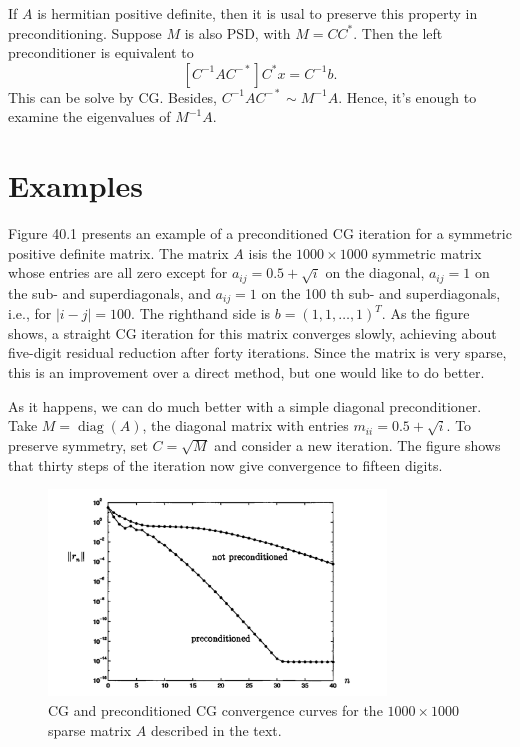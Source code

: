 If $ A $ is hermitian positive definite, then it is usal to preserve this property  in preconditioning. Suppose $ M $ is also PSD, with $ M = CC^*  $. Then the left preconditioner is equivalent to 
\[
    [C^{-1}  A C^{-*}] C^* x = C^{-1} b.
\]
This can be solve by CG. Besides, $ C^{-1}  A C^{-*} \sim M^{-1} A$. Hence, it's enough to examine the eigenvalues of $ M^{-1} A $. 

\section{Examples} 
Figure 40.1 presents an example of a preconditioned CG iteration for a symmetric positive definite matrix. The matrix $A$ isis the $1000 \times 1000$ symmetric matrix whose entries are all zero except for $a_{i j}=0.5+\sqrt{i}$ on the diagonal, $a_{i j}=1$ on the sub- and superdiagonals, and $a_{i j}=1$ on the 100 th sub- and superdiagonals, i.e., for $|i-j|=100$. The righthand side is $b=(1,1, \ldots, 1)^T$. As the figure shows, a straight CG iteration for this matrix converges slowly, achieving about five-digit residual reduction after forty iterations. Since the matrix is very sparse, this is an improvement over a direct method, but one would like to do better.

As it happens, we can do much better with a simple diagonal preconditioner. Take $M=\operatorname{diag}(A)$, the diagonal matrix with entries $m_{i i}=0.5+\sqrt{i}$. To preserve symmetry, set $C=\sqrt{M}$ and consider a new iteration. The figure shows that thirty steps of the iteration now give convergence to fifteen digits.

\begin{figure}[H]
    \centering
    \includegraphics[width=0.8\textwidth]{figures/40-1.png}
    \caption{CG and preconditioned CG convergence curves for the $ 1000\times 1000 $ sparse matrix $ A $ described in the text. }
\end{figure}

